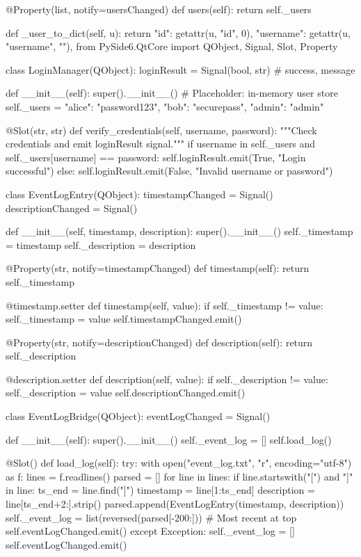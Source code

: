 \documentclass{report}
\begin{document}
\begin{python}
    @Property(list, notify=usersChanged)
    def users(self):
        return self._users

    def _user_to_dict(self, u):
        return {
            "id": getattr(u, "id", 0),
            "username": getattr(u, "username", ""),
        }
from PySide6.QtCore import QObject, Signal, Slot, Property

class LoginManager(QObject):
    loginResult = Signal(bool, str)  # success, message

    def __init__(self):
        super().__init__()
        # Placeholder: in-memory user store
        self._users = {
            "alice": "password123",
            "bob": "securepass",
            "admin": "admin"
        }

    @Slot(str, str)
    def verify_credentials(self, username, password):
        """Check credentials and emit loginResult signal."""
        if username in self._users and self._users[username] == password:
            self.loginResult.emit(True, "Login successful")
        else:
            self.loginResult.emit(False, "Invalid username or password")

class EventLogEntry(QObject):
    timestampChanged = Signal()
    descriptionChanged = Signal()

    def __init__(self, timestamp, description):
        super().__init__()
        self._timestamp = timestamp
        self._description = description

    @Property(str, notify=timestampChanged)
    def timestamp(self):
        return self._timestamp

    @timestamp.setter
    def timestamp(self, value):
        if self._timestamp != value:
            self._timestamp = value
            self.timestampChanged.emit()

    @Property(str, notify=descriptionChanged)
    def description(self):
        return self._description

    @description.setter
    def description(self, value):
        if self._description != value:
            self._description = value
            self.descriptionChanged.emit()

class EventLogBridge(QObject):
    eventLogChanged = Signal()

    def __init__(self):
        super().__init__()
        self._event_log = []
        self.load_log()

    @Slot()
    def load_log(self):
        try:
            with open("event_log.txt", "r", encoding="utf-8") as f:
                lines = f.readlines()
            parsed = []
            for line in lines:
                if line.startswith("[") and "]" in line:
                    ts_end = line.find("]")
                    timestamp = line[1:ts_end]
                    description = line[ts_end+2:].strip()
                    parsed.append(EventLogEntry(timestamp, description))
            self._event_log = list(reversed(parsed[-200:]))  # Most recent at top
            self.eventLogChanged.emit()
        except Exception:
            self._event_log = []
            self.eventLogChanged.emit()


\end{python}
\end{document}
